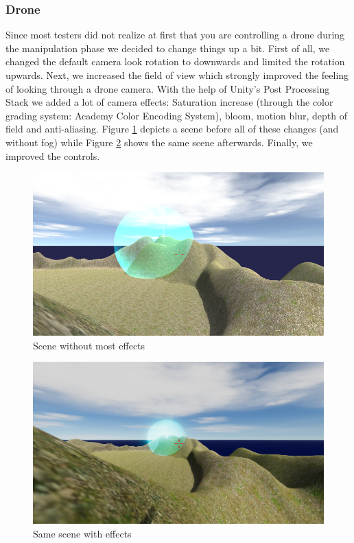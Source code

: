 \documentclass[12pt, letterpaper]{scrartcl}
\begin{document}
	\subsubsection{Drone}
	Since most testers did not realize at first that you are controlling a drone during the manipulation phase we decided to change things up a bit. First of all, we changed the default camera look rotation to downwards and limited the rotation upwards. Next, we increased the field of view which strongly improved the feeling of looking through a drone camera. With the help of Unity's Post Processing Stack we added a lot of camera effects: Saturation increase (through the color grading system: Academy Color Encoding System), bloom, motion blur, depth of field and anti-aliasing. Figure \ref{fig:sceneWithoutEffects} depicts a scene before all of these changes (and without fog) while Figure \ref{fig:sceneWithEffects} shows the same scene afterwards. Finally, we improved the controls.
	\begin{figure}[H]
		\centering
		\includegraphics[width=\textwidth-4cm]{images/final/DroneEffects1}
		\caption{Scene without most effects}
		\label{fig:sceneWithoutEffects}
	\end{figure}
	\begin{figure}[H]
		\centering
		\includegraphics[width=\textwidth-4cm]{images/final/DroneEffects2}
		\caption{Same scene with effects}
		\label{fig:sceneWithEffects}
	\end{figure}
	
\end{document}
